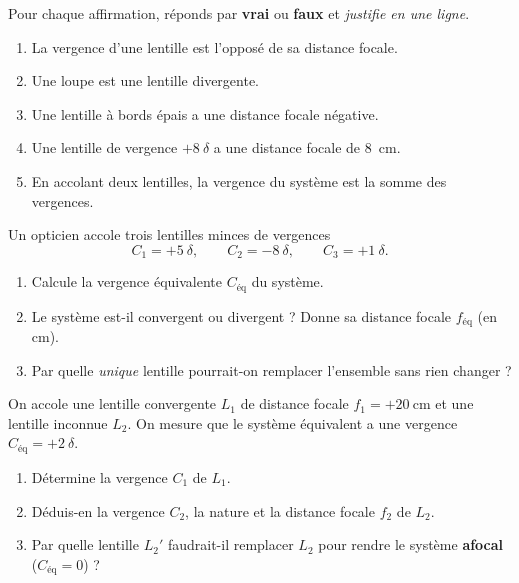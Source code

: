\documentclass[11pt,a4paper]{article}
\begin{document}

\begin{exo}
Pour chaque affirmation, réponds par \textbf{vrai} ou \textbf{faux} et \emph{justifie en une ligne}.
\begin{enumerate}[label=\alph*)]
  \item La vergence d'une lentille est l'opposé de sa distance focale.
  \item Une loupe est une lentille divergente.
  \item Une lentille à bords épais a une distance focale négative.
  \item Une lentille de vergence $+8~\delta$ a une distance focale de \qty{8}{\cm}.
  \item En accolant deux lentilles, la vergence du système est la somme des vergences.
\end{enumerate}
\end{exo}

\begin{exo}
Un opticien accole trois lentilles minces de vergences
\[ C_1=+5~\delta,\qquad C_2=-8~\delta,\qquad C_3=+1~\delta. \]
\begin{enumerate}[label=\alph*)]
  \item Calcule la vergence équivalente $C_{\text{éq}}$ du système.
  \item Le système est-il convergent ou divergent ? Donne sa distance focale $f_{\text{éq}}$ (en cm).
  \item Par quelle \emph{unique} lentille pourrait-on remplacer l'ensemble sans rien changer ?
\end{enumerate}
\end{exo}

\begin{exo}
On accole une lentille convergente $L_1$ de distance focale $f_1=+\qty{20}{\cm}$ et une lentille
inconnue $L_2$. On mesure que le système équivalent a une vergence $C_{\text{éq}}=+2~\delta$.
\begin{enumerate}[label=\alph*)]
  \item Détermine la vergence $C_1$ de $L_1$.
  \item Déduis-en la vergence $C_2$, la nature et la distance focale $f_2$ de $L_2$.
  \item Par quelle lentille $L_2'$ faudrait-il remplacer $L_2$ pour rendre le système
        \textbf{afocal} ($C_{\text{éq}}=0$) ?
\end{enumerate}
\end{exo}
\end{document}
